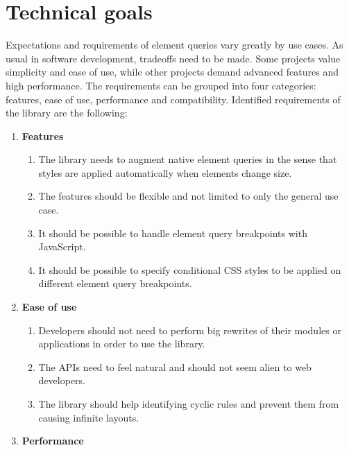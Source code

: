 \documentclass[a4paper,11pt]{kth-mag}
\begin{document}
    \section{Technical goals}\label{sec:techincal-goals}
      Expectations and requirements of element queries vary greatly by use cases.
      As usual in software development, tradeoffs need to be made.
      Some projects value simplicity and ease of use, while other projects demand advanced features and high performance.
      The requirements can be grouped into four categories: features, ease of use, performance and compatibility.
      Identified requirements of the library are the following:
      \begin{enumerate}
        \item \textbf{Features}
          \begin{enumerate}
            \item\label{itm:req_resize_detect}    The library needs to augment \gls{native} element queries in the sense that styles are applied automatically when \glspl{element} change size.
            \item\label{itm:req_flexible}         The features should be flexible and not limited to only the general use case.
            \item\label{itm:req_bp_js}            It should be possible to handle element query breakpoints with \gls{JavaScript}.
            \item\label{itm:req_conditional_css}  It should be possible to specify conditional \gls{CSS} styles to be applied on different element query breakpoints.
          \end{enumerate}
        \item \textbf{Ease of use}
          \begin{enumerate}
            \item\label{itm:req_big_rewrite}      Developers should not need to perform big rewrites of their modules or applications in order to use the library.
            \item\label{itm:natural}              The \glspl{API} need to feel natural and should not seem alien to \gls{web} developers.
            \item\label{itm:req_cyclic_rules}     The library should help identifying cyclic rules and prevent them from causing infinite layouts.
          \end{enumerate}
        \item \textbf{Performance}
          \begin{enumerate}

\end{enumerate}
\end{enumerate}
\end{document}
